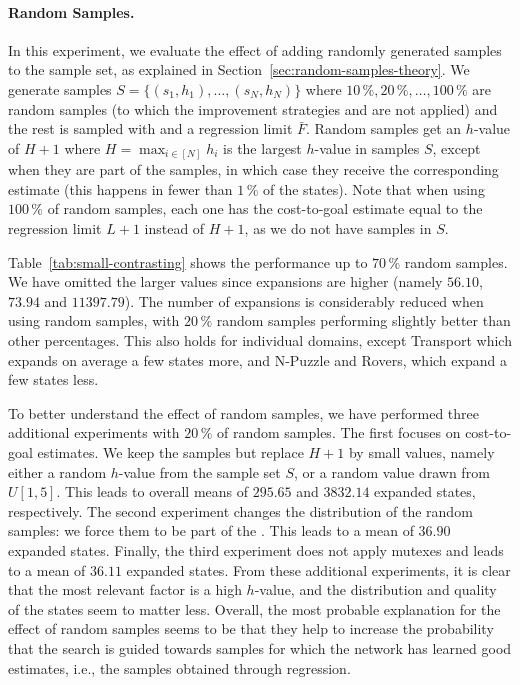 \paragraph{Random Samples.}

In this experiment, we evaluate the effect of adding randomly generated samples to the sample set, as explained in Section~\ref{sec:random-samples-theory}. We generate samples $S=\{(s_1,h_1),\ldots,(s_N,h_N)\}$ where $10\,\%, 20\,\%,\ldots,100\,\%$ are random samples (to which the improvement strategies \hmin and \hvfc are not applied) and the rest is sampled with \bfsrw and a regression limit $\bar F$. Random samples get an $h$-value of $H+1$ where $H=\max_{i\in[N]} h_i$ is the largest $h$-value in samples $S$, except when they are part of the samples, in which case they receive the corresponding estimate (this happens in fewer than $1\,\%$ of the states). Note that when using $100\,\%$ of random samples, each one has the cost-to-goal estimate equal to the regression limit $L+1$ instead of $H+1$, as we do not have samples in $S$.



Table~\ref{tab:small-contrasting} shows the performance up to $70\,\%$ random samples. We have omitted the larger values since expansions are higher (namely $56.10$, $73.94$ and $11397.79$). The number of expansions is considerably reduced when using random samples, with $20\,\%$ random samples performing slightly better than other percentages. This also holds for individual domains, except Transport which expands on average a few states more, and N-Puzzle and Rovers, which expand a few states less.

To better understand the effect of random samples, we have performed three additional experiments with $20\,\%$ of random samples. The first focuses on cost-to-goal estimates. We keep the samples but replace $H+1$ by small values, namely either a random $h$-value from the sample set $S$, or a random value drawn from $U[1,5]$. This leads to overall means of $295.65$ and $3832.14$ expanded states, respectively. The second experiment changes the distribution of the random samples: we force them to be part of the \fssp. This leads to a mean of $36.90$ expanded states. Finally, the third experiment does not apply mutexes and leads to a mean of $36.11$ expanded states. From these additional experiments, it is clear that the most relevant factor is a high $h$-value, and the distribution and quality of the states seem to matter less. Overall, the most probable explanation for the effect of random samples seems to be that they help to increase the probability that the search is guided towards samples for which the network has learned good estimates, i.e., the samples obtained through regression.

